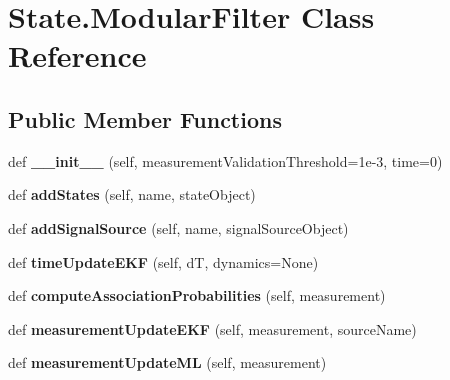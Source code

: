 \hypertarget{classState_1_1ModularFilter}{}\section{State.\+Modular\+Filter Class Reference}
\label{classState_1_1ModularFilter}
\subsection*{Public Member Functions}
\begin{DoxyCompactItemize}
\item 
def {\bfseries \+\_\+\+\_\+init\+\_\+\+\_\+} (self, measurement\+Validation\+Threshold=1e-\/3, time=0)\hypertarget{classState_1_1ModularFilter_adfd8a992021bd65553e9def54c5dff3b}{}\label{classState_1_1ModularFilter_adfd8a992021bd65553e9def54c5dff3b}

\item 
def {\bfseries add\+States} (self, name, state\+Object)\hypertarget{classState_1_1ModularFilter_adca05e3ee0d9fc67f136e9530a8cbc7e}{}\label{classState_1_1ModularFilter_adca05e3ee0d9fc67f136e9530a8cbc7e}

\item 
def {\bfseries add\+Signal\+Source} (self, name, signal\+Source\+Object)\hypertarget{classState_1_1ModularFilter_a1b349f50ec22b30eb007a014c045cc94}{}\label{classState_1_1ModularFilter_a1b349f50ec22b30eb007a014c045cc94}

\item 
def {\bfseries time\+Update\+E\+KF} (self, dT, dynamics=None)\hypertarget{classState_1_1ModularFilter_ac9d579bcc4e100cd46bbfc2a0c86e51a}{}\label{classState_1_1ModularFilter_ac9d579bcc4e100cd46bbfc2a0c86e51a}

\item 
def {\bfseries compute\+Association\+Probabilities} (self, measurement)\hypertarget{classState_1_1ModularFilter_aa04c2b4d007a4bc5e98d5da00d6683ea}{}\label{classState_1_1ModularFilter_aa04c2b4d007a4bc5e98d5da00d6683ea}

\item 
def {\bfseries measurement\+Update\+E\+KF} (self, measurement, source\+Name)\hypertarget{classState_1_1ModularFilter_a1e6b78bdafffb5298fd6e5d2a022a878}{}\label{classState_1_1ModularFilter_a1e6b78bdafffb5298fd6e5d2a022a878}

\item 
def {\bfseries measurement\+Update\+ML} (self, measurement)\hypertarget{classState_1_1ModularFilter_ac2d6be561f461f0501e451fc5be0811f}{}\label{classState_1_1ModularFilter_ac2d6be561f461f0501e451fc5be0811f}


\end{DoxyCompactItemize}
